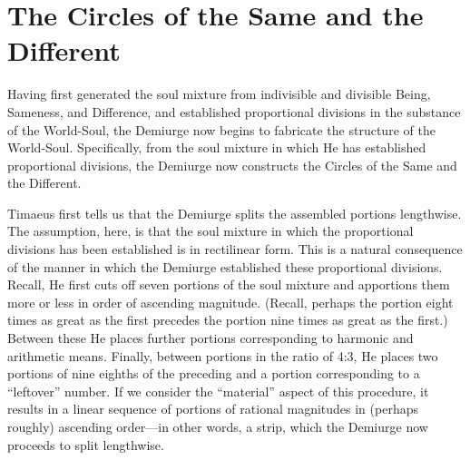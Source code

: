 
\section{The Circles of the Same and the Different} %
\label{sec:the_circles_of_the_same_and_the_different}

Having first generated the soul mixture from indivisible and divisible Being, Sameness, and Difference, and established proportional divisions in the substance of the World-Soul, the Demiurge now begins to fabricate the structure of the World-Soul. Specifically, from the soul mixture in which He has established proportional divisions, the Demiurge now constructs the Circles of the Same and the Different.

Timaeus first tells us that the Demiurge splits the assembled portions lengthwise. The assumption, here, is that the soul mixture in which the proportional divisions has been established is in rectilinear form. This is a natural consequence of the manner in which the Demiurge established these proportional divisions. Recall, He first cuts off seven portions of the soul mixture and apportions them more or less in order of ascending magnitude. (Recall, perhaps the portion eight times as great as the first precedes the portion nine times as great as the first.) Between these He places further portions corresponding to harmonic and arithmetic means. Finally, between portions in the ratio of 4:3, He places two portions of nine eighths of the preceding and a portion corresponding to a ``leftover'' number. If we consider the ``material'' aspect of this procedure, it results in a linear sequence of portions of rational magnitudes in (perhaps roughly) ascending order---in other words, a strip, which the Demiurge now proceeds to split lengthwise.


